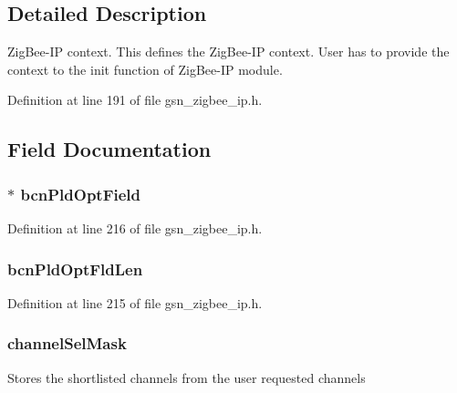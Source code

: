 \subsection{Detailed Description}
ZigBee-\/IP context. This defines the ZigBee-\/IP context. User has to provide the context to the init function of ZigBee-\/IP module. 

Definition at line 191 of file gsn\_\-zigbee\_\-ip.h.



\subsection{Field Documentation}
\hypertarget{a00440_a84b867442a9df3ae3fd28cee436846ed}{
\subsubsection[{bcnPldOptField}]{$\ast$ {\bf bcnPldOptField}}}
\label{a00440_a84b867442a9df3ae3fd28cee436846ed}


Definition at line 216 of file gsn\_\-zigbee\_\-ip.h.

\hypertarget{a00440_a4dbf679669c21dfe3cde14a52d6493ba}{
\subsubsection[{bcnPldOptFldLen}]{ {\bf bcnPldOptFldLen}}}
\label{a00440_a4dbf679669c21dfe3cde14a52d6493ba}


Definition at line 215 of file gsn\_\-zigbee\_\-ip.h.

\hypertarget{a00440_a7d5d0df3692ac043cf707cf61b5efe85}{
\subsubsection[{channelSelMask}]{ {\bf channelSelMask}}}
\label{a00440_a7d5d0df3692ac043cf707cf61b5efe85}
Stores the shortlisted channels from the user requested channels 

